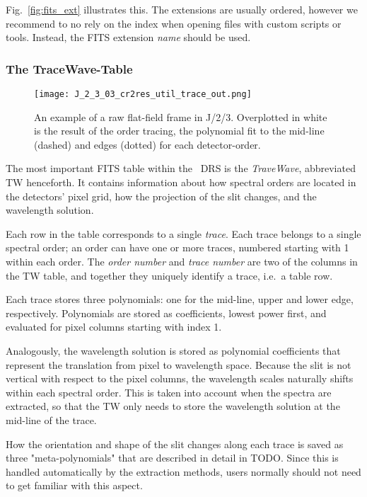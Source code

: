 Fig.~\ref{fig:fits_ext} illustrates this. The extensions are usually ordered,
however we recommend to no rely on the index when opening files with custom
scripts or tools. Instead, the FITS extension \emph{name} should be used.

\subsubsection{The TraceWave-Table}
\label{sec:tracewave}

\begin{figure}[!tb]
    \begin{center}
      \texttt{[image: J\_2\_3\_03\_cr2res\_util\_trace\_out.png]}
    \end{center}
    \caption{
      \label{fig:flat_trace}
      An example of a raw flat-field frame in J/2/3. Overplotted in white is 
      the result of the order tracing, the polynomial fit to the mid-line
      (dashed) and edges (dotted) for each detector-order.
      }
  \end{figure}

The most important FITS table within the \instrument\ DRS is the
\emph{TraveWave}, abbreviated TW henceforth. It contains information about how
spectral orders are located in the detectors' pixel grid, how the projection of
the slit changes, and the wavelength solution.

Each row in the table corresponds to a single \emph{trace}. Each trace belongs
to a single spectral order; an order can have one or more traces, numbered
starting with 1 within each order. The \emph{order number} and \emph{trace
number} are two of the columns in the TW table, and together they uniquely
identify a trace, i.e.~a table row.

Each trace stores three polynomials: one for the mid-line, upper and lower edge,
respectively. Polynomials are stored as coefficients, lowest power first, and
evaluated for pixel columns starting with index 1.

Analogously, the wavelength solution is stored as polynomial coefficients that
represent the translation from pixel to wavelength space. Because the slit is
not vertical with respect to the pixel columns, the wavelength scales naturally
shifts within each spectral order. This is taken into account when the spectra
are extracted, so that the TW only needs to store the wavelength solution at the
mid-line of the trace.

How the orientation and shape of the slit changes along each trace is saved as
three "meta-polynomials" that are described in detail in TODO. Since this is handled automatically by the extraction methods, users normally should not need to get familiar with this aspect.

